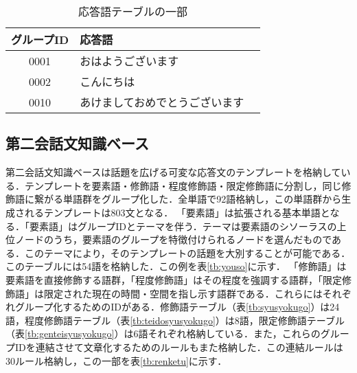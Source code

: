 \begin{table}[htbp]
    \begin{center}
      \caption{応答語テーブルの一部}
      \label{tb:outougo}
      \begin{tabular}{clc}
        \hline
        グループID 	& 応答語 \\
        \hline
        0001 		& おはようございます \\
        0002 		& こんにちは \\
        0010 		& あけましておめでとうございます \\
        \hline
      \end{tabular}
    \end{center}
\end{table}

\subsection{第二会話文知識ベース}
第二会話文知識ベースは話題を広げる可変な応答文のテンプレートを格納している．テンプレートを要素語・修飾語・程度修飾語・限定修飾語に分割し，同じ修飾語に繋がる単語群をグループ化した．全単語で92語格納し，この単語群から生成されるテンプレートは803文となる．
「要素語」は拡張される基本単語となる．「要素語」はグループIDとテーマを伴う．テーマは要素語のシソーラス\cite{NttThesaurus1997}の上位ノードのうち，要素語のグループを特徴付けられるノードを選んだものである．このテーマにより，そのテンプレートの話題を大別することが可能である．このテーブルには54語を格納した．この例を表\ref{tb:youso}に示す．
「修飾語」は要素語を直接修飾する語群，「程度修飾語」はその程度を強調する語群，「限定修飾語」は限定された現在の時間・空間を指し示す語群である．これらにはそれぞれグループ化するためのIDがある．修飾語テーブル（表\ref{tb:syusyokugo}）は24語，程度修飾語テーブル（表\ref{tb:teidosyusyokugo}）は8語，限定修飾語テーブル（表\ref{tb:genteisyusyokugo}）は6語それぞれ格納している．また，これらのグループIDを連結させて文章化するためのルールもまた格納した．この連結ルールは30ルール格納し，この一部を表\ref{tb:renketu}に示す．
